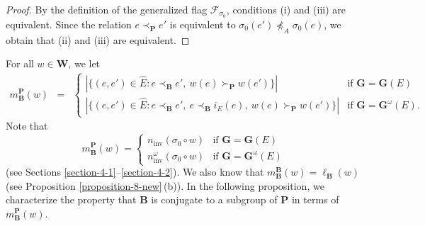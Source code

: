 \documentclass[12pt]{amsart}
\theoremstyle{definition}
\begin{document}
\begin{proof}
By the definition of the generalized flag $\mathcal{F}_{\sigma_0}$, conditions {\rm (i)} and {\rm (iii)} are equivalent. Since the relation $e\prec_\mathbf{P}e'$ is equivalent to $\sigma_0(e')\not\preceq_A\sigma_0(e)$, we obtain that {\rm (ii)} and {\rm (iii)} are equivalent.
\end{proof}

For all $w\in\mathbf{W}$, we let
\begin{eqnarray*}
m_\mathbf{B}^\mathbf{P}(w)
 & = & \left\{\begin{array}{ll}
|\{(e,e')\in\hat{E}:e\prec_\mathbf{B}e',\ w(e)\succ_\mathbf{P} w(e')\}|  & \mbox{if $\mathbf{G}=\mathbf{G}(E)$} \\
|\{(e,e')\in\hat{E}:e\prec_\mathbf{B}e',\ e\prec_\mathbf{B}i_E(e),\ w(e)\succ_\mathbf{P} w(e')\}| & \mbox{if $\mathbf{G}=\mathbf{G}^\omega(E)$.}
\end{array}\right.
\end{eqnarray*}
Note that
\begin{equation}
\label{16-newnew}
m_\mathbf{B}^\mathbf{P}(w)=\left\{\begin{array}{ll}
n_\mathrm{inv}(\sigma_0\circ w) & \mbox{if $\mathbf{G}=\mathbf{G}(E)$} \\
n^\omega_\mathrm{inv}(\sigma_0\circ w) & \mbox{if $\mathbf{G}=\mathbf{G}^\omega(E)$}
\end{array}\right.
\end{equation}
(see Sections \ref{section-4-1}--\ref{section-4-2}).
We also know that $m_\mathbf{B}^\mathbf{B}(w)=\ell_\mathbf{B}(w)$ (see Proposition \ref{proposition-8-new}\,{\rm (b)}).
In the following proposition, we characterize the property that $\mathbf{B}$ is conjugate to a subgroup of $\mathbf{P}$ in terms of  $m_\mathbf{B}^\mathbf{P}(w)$.
\end{document}
